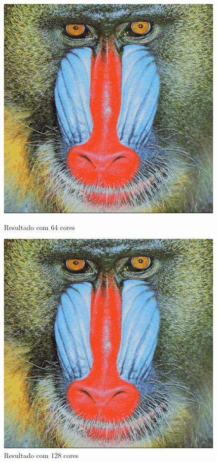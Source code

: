 \documentclass{article}
\begin{document}
\begin{figure}[!htb]
  \begin{minipage}{0.42\textwidth}
    \centering
    \includegraphics[width=.99\linewidth]{images/res64.png}
    \caption{Resultado com 64 cores}\label{Fig:res64}
  \end{minipage}\hfill
  \begin{minipage}{0.42\textwidth}
    \centering
    \includegraphics[width=.99\linewidth]{images/res64.png}
    \caption{Resultado com 128 cores}\label{Fig:res128}
  \end{minipage}
\end{figure}
\end{document}
